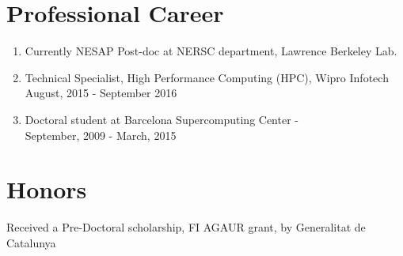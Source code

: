 \documentclass[margin]{res}
\begin{document}
\begin{resume}
\section{Professional Career}
%
\begin{enumerate}
     \item Currently NESAP Post-doc at NERSC department, Lawrence Berkeley Lab.
	   \item Technical Specialist, High Performance Computing (HPC), Wipro Infotech \\
			 August, 2015 - September 2016
	   \item Doctoral student at Barcelona Supercomputing Center - \\
			 September, 2009 - March, 2015
\end{enumerate}
%
\section{Honors}
Received a Pre-Doctoral scholarship, FI AGAUR grant,  by Generalitat de Catalunya

%
\end{resume}
%
\end{document}
